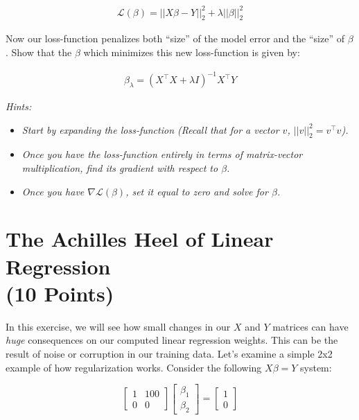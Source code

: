\documentclass[12pt,letterpaper]{article}
\begin{document}
\begin{align}
    \mathcal{L}(\beta) = || X \beta - Y||_2^2 + \lambda || \beta||_2^2
\end{align}

Now our loss-function penalizes both \enquote{size} of the model error and the \enquote{size} of $\beta$. Show that the $\beta$ which minimizes this new loss-function is given by:

\begin{align}
    \beta_\lambda = \left( X^\top X + \lambda I \right)^{-1} X^\top Y
\end{align}

\textit{Hints:} 

\begin{itemize}
    \item \textit{Start by expanding the loss-function (Recall that for a vector $v$, $||v||_2^2 = v^\top v $).}
    \item \textit{Once you have the loss-function entirely in terms of matrix-vector multiplication, find its gradient with respect to $\beta$. }
    \item \textit{Once you have $\nabla \mathcal{L}(\beta)$, set it equal to zero and solve for $\beta$.} 
\end{itemize}

\vfill \pagebreak 

\section{The Achilles Heel of Linear Regression \\ \large (10 Points)}

In this exercise, we will see how small changes in our $X$ and $Y$ matrices can have \textit{huge} consequences on our computed linear regression weights. This can be the result of noise or corruption in our training data. Let's examine a simple 2x2 example of how regularization works. Consider the following $X \beta = Y$ system: 

$$ \begin{bmatrix} 1 & 100 \\ 0 & 0 \end{bmatrix} \begin{bmatrix} \beta_1 \\ \beta_2 \end{bmatrix} = \begin{bmatrix} 1 \\ 0 \end{bmatrix} $$ 
\end{document}
